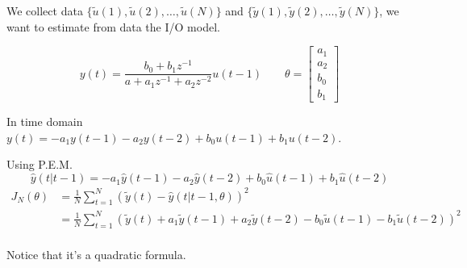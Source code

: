 \begin{example}
    We collect data $\{ \tilde{u}(1), \tilde{u}(2), \dots, \tilde{u}(N) \}$ and $\{ \tilde{y}(1), \tilde{y}(2), \dots, \tilde{y}(N) \}$, we want to estimate from data the I/O model.

    \[
        y(t) = \frac{b_0 + b_1z^{-1}}{a+a_1z^{-1} + a_2z^{-2}}u(t-1) \qquad \theta = \begin{bmatrix}
            a_1 \\ a_2 \\ b_0 \\ b_1
        \end{bmatrix}
    \]

    In time domain $y(t) = -a_1y(t-1)-a_2y(t-2)+b_0u(t-1)+b_1u(t-2)$.

    Using P.E.M.
    \[
        \hat{y}(t|t-1) = -a_1\hat{y}(t-1)-a_2\hat{y}(t-2)+b_0\hat{u}(t-1)+b_1\hat{u}(t-2)
    \]
    \begin{align*}
        J_N(\theta) &= \frac{1}{N}\sum_{t=1}^N \left( \tilde{y}(t) - \hat{y}(t|t-1, \theta) \right)^2 \\
        &= \frac{1}{N}\sum_{t=1}^N \left( \tilde{y}(t) +a_1\tilde{y}(t-1)+a_2\tilde{y}(t-2)-b_0\tilde{u}(t-1)-b_1\tilde{u}(t-2) \right)^2 \\
    \end{align*}

    Notice that it's a quadratic formula.

    \begin{figure}[H]
        \begin{minipage}[t]{0.5\textwidth}
            \centering
\end{minipage}
\end{figure}
\end{example}
